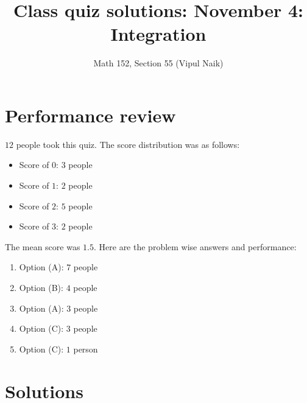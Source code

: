 \documentclass[10pt]{amsart}
\title{Class quiz solutions: November 4: Integration}
\author{Math 152, Section 55 (Vipul Naik)}
\begin{document}
\maketitle

\section{Performance review}

$12$ people took this quiz. The score distribution was as follows:

\begin{itemize}
\item Score of $0$: $3$ people
\item Score of $1$: $2$ people
\item Score of $2$: $5$ people
\item Score of $3$: $2$ people
\end{itemize}

The mean score was $1.5$. Here are the problem wise answers and performance:

\begin{enumerate}
\item Option (A): $7$ people
\item Option (B): $4$ people
\item Option (A): $3$ people
\item Option (C): $3$ people
\item Option (C): $1$ person
\end{enumerate}

\section{Solutions}
\end{document}
